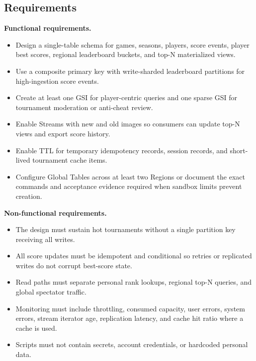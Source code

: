 \subsection*{Requirements}
\textbf{Functional requirements.}
\begin{itemize}
    \item Design a single-table schema for games, seasons, players, score events, player best scores, regional leaderboard buckets, and top-N materialized views.
    \item Use a composite primary key with write-sharded leaderboard partitions for high-ingestion score events.
    \item Create at least one GSI for player-centric queries and one sparse GSI for tournament moderation or anti-cheat review.
    \item Enable Streams with new and old images so consumers can update top-N views and export score history.
    \item Enable TTL for temporary idempotency records, session records, and short-lived tournament cache items.
    \item Configure Global Tables across at least two Regions or document the exact commands and acceptance evidence required when sandbox limits prevent creation.
\end{itemize}

\textbf{Non-functional requirements.}
\begin{itemize}
    \item The design must sustain hot tournaments without a single partition key receiving all writes.
    \item All score updates must be idempotent and conditional so retries or replicated writes do not corrupt best-score state.
    \item Read paths must separate personal rank lookups, regional top-N queries, and global spectator traffic.
    \item Monitoring must include throttling, consumed capacity, user errors, system errors, stream iterator age, replication latency, and cache hit ratio where a cache is used.
    \item Scripts must not contain secrets, account credentials, or hardcoded personal data.
\end{itemize}

